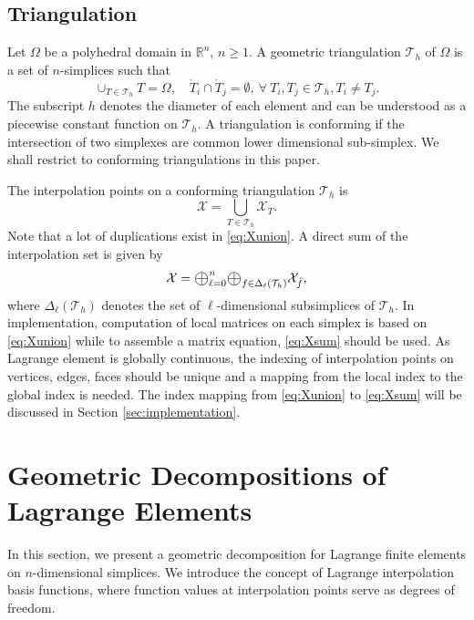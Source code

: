 \documentclass[mathpazo]{cicp}
\newcommand{\Oplus}{\ensuremath{\vcenter{\hbox{\scalebox{1.5}{$\oplus$}}}}}
\begin{document}
\subsection{Triangulation}
Let $\Omega$ be a polyhedral domain in $\mathbb R^n$, $n\geq1$. A geometric
triangulation $\mathcal T_h$ of $\Omega$ is a set of $n$-simplices such that
$$
\cup_{T\in \mathcal T_h} T = \Omega, \quad \mathring T_i \cap \mathring T_j =
\emptyset, \ \forall\ T_i, T_j \in \mathcal T_h, T_i \neq T_j.
$$
The subscript $h$ denotes the diameter of each element and can be understood as a piecewise constant function on $\mathcal T_h$. 
A  triangulation is conforming if the intersection of two simplexes are common lower dimensional sub-simplex. We shall restrict to conforming triangulations in this paper. 

The interpolation points on a conforming triangulation $\mathcal T_h$ is 
\begin{equation}\label{eq:Xunion}
\mathcal X = \bigcup_{T\in \mathcal T_h}\mathcal X_{T}.
\end{equation}
Note that a lot of duplications exist in \eqref{eq:Xunion}. A direct sum of the interpolation set is given by 
\begin{equation}\label{eq:Xsum}
\mathcal X = \Oplus_{\ell = 0}^n \Oplus_{f\in \Delta_{\ell}(\mathcal T_h)} \mathcal X_{\mathring{f}},
\end{equation}
where $\Delta_{\ell}(\mathcal T_h)$ denotes the set of $\ell$-dimensional subsimplices of $\mathcal T_h$.
In implementation, computation of local matrices on each simplex is based on \eqref{eq:Xunion} while to assemble a matrix equation, \eqref{eq:Xsum} should be used. As Lagrange element is globally continuous, the indexing of interpolation points on vertices, edges, faces should be unique and a mapping from the local index to the global index is needed. The index mapping from \eqref{eq:Xunion} to \eqref{eq:Xsum} will be discussed in Section \ref{sec:implementation}. 




\section{Geometric Decompositions of Lagrange Elements}\label{sec:lagrange}
In this section, we present a geometric decomposition for Lagrange finite elements on $n$-dimensional simplices. We introduce the concept of Lagrange interpolation basis functions, where function values at interpolation points serve as degrees of freedom. 
\end{document}
